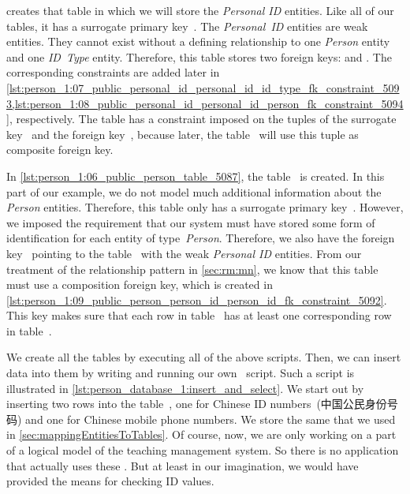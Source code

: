  creates that table in which we will store the \emph{Personal ID} entities.
Like all of our tables, it has a surrogate primary key~.
The \emph{Personal~ID} entities are weak entities.
They cannot exist without a defining relationship to one \emph{Person} entity and one \emph{ID~Type} entity.
Therefore, this table stores two foreign keys:
 and .
The corresponding constraints are added later in \cref{lst:person_1:07_public_personal_id_personal_id_id_type_fk_constraint_5093,lst:person_1:08_public_personal_id_personal_id_person_fk_constraint_5094}, respectively.
The table has a  constraint imposed on the tuples of the surrogate key~ and the foreign key~, because later, the table~ will use this tuple as composite foreign key.

In \cref{lst:person_1:06_public_person_table_5087}, the table~ is created.
In this part of our example, we do not model much additional information about the \emph{Person} entities.
Therefore, this table only has a surrogate primary key~.
However, we imposed the requirement that our system must have stored some form of identification for each entity of type~\emph{Person}.
Therefore, we also have the foreign key~ pointing to the table~ with the weak \emph{Personal ID} entities.
From our treatment of the  relationship pattern in \cref{sec:rm:mn}, we know that this table must use a composition foreign key, which is created in \cref{lst:person_1:09_public_person_person_id_person_id_fk_constraint_5092}.
This key makes sure that each row in table~ has at least one corresponding row in table~.

We create all the tables by executing all of the above scripts.
Then, we can insert data into them by writing and running our own \sql\ script.
Such a script is illustrated in \cref{lst:person_database_1:insert_and_select}.
We start out by inserting two rows into the table~, one for Chinese ID numbers~(中国公民身份号码) and one for Chinese mobile phone numbers.
We store the same  that we used in \cref{sec:mappingEntitiesToTables}.
Of course, now, we are only working on a part of a logical model of the teaching management system.
So there is no application that actually uses these .
But at least in our imagination, we would have provided the means for checking ID values.

